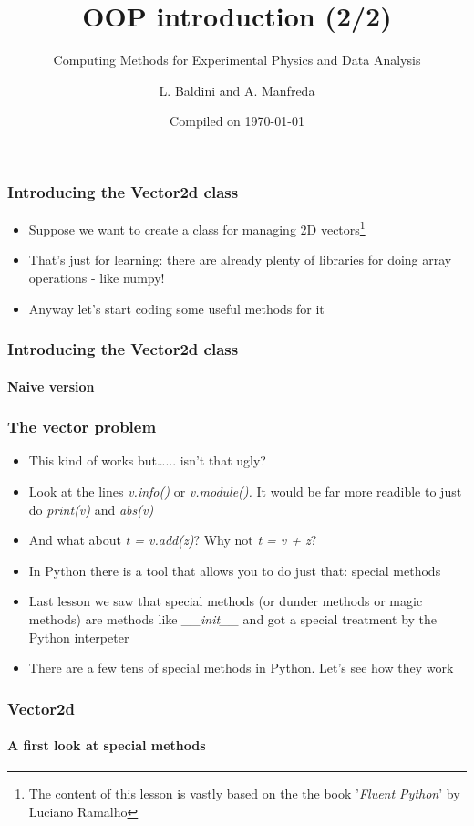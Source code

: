 \documentclass[9pt]{beamer}
\title{OOP introduction (2/2)}
\subtitle{Computing Methods for Experimental Physics and Data Analysis}
\date{Compiled on \today}
\author{L. Baldini and A. Manfreda}
\institute[INFN]{INFN--Pisa}
\begin{document}
\titleframe


\begin{frame}
  \frametitle{Introducing the Vector2d class}

  \begin{itemize}
    \item Suppose we want to create a class for managing 2D vectors\footnote{%
      The content of this lesson is vastly based on the the book '\emph{Fluent Python}' by Luciano Ramalho}
    \bigskip
    \item That's just for learning: there are already plenty of libraries for
          doing array operations - like numpy!
    \bigskip
    \item Anyway let's start coding some useful methods for it
  \end{itemize}

\end{frame}


\begin{frame}
  \frametitle{Introducing the Vector2d class}
  \framesubtitle{Naive version}
  
\end{frame}


\begin{frame}
  \frametitle{The vector problem}

  \begin{itemize}
    \item This kind of works but\dots... isn't that ugly?
    \medskip
    \item Look at the lines \emph{v.info()} or \emph{v.module().}
          It would be far more readible to just do \emph{print(v)} and \emph{abs(v)}
    \medskip
    \item And what about \emph{t = v.add(z)}? Why not \emph{t = v + z}?
    \medskip
    \item In Python there is a tool that allows you to do just that: \alert{special methods}
    \medskip
    \item Last lesson we saw that special methods (or dunder methods or
          magic methods) are methods like \emph{\_\_init\_\_} and got a special
          treatment by the Python interpeter
    \medskip
    \item There are a few tens of special methods in Python. Let's see how they work
  \end{itemize}

\end{frame}


\begin{frame}
  \frametitle{Vector2d}
  \framesubtitle{A first look at special methods}
  
\end{frame}
\end{document}
